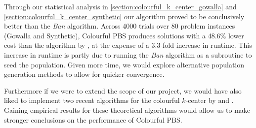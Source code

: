 Through our statistical analysis in \cref{section:colourful_k_center_gowalla} and \cref{section:colourful_k_center_synthetic} our algorithm proved to be conclusively better than the \emph{Ban} algorithm. Across 4000 trials over 80 problem instances (Gowalla and Synthetic), Colourful PBS produces solutions with a 48.6\% lower cost than the algorithm by \citeauthor{bandyapadhyay_constant_2019}, at the expense of a 3.3-fold increase in runtime. This increase in runtime is partly due to running the \emph{Ban} algorithm as a subroutine to seed the population. Given more time, we would explore alternative population generation methods to allow for quicker convergence.

Furthermore if we were to extend the scope of our project, we would have also liked to implement two recent algorithms for the colourful $k$-center by \textcite{jia_fair_2020} and \textcite{anegg_technique_2020}. Gaining empirical results for these theoretical algorithms would allow us to make stronger conclusions on the performance of Colourful PBS.  